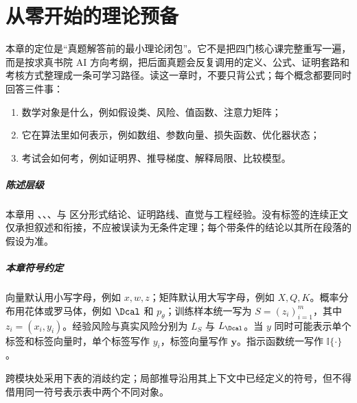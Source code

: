 \chapter{从零开始的理论预备}
\label{ch:primer}

本章的定位是“真题解答前的最小理论闭包”。它不是把四门核心课完整重写一遍，而是按求真书院 AI 方向考纲，把后面真题会反复调用的定义、公式、证明套路和考核方式整理成一条可学习路径。读这一章时，不要只背公式；每个概念都要同时回答三件事：

\begin{enumerate}
  \item 数学对象是什么，例如假设类、风险、值函数、注意力矩阵；
  \item 它在算法里如何表示，例如数组、参数向量、损失函数、优化器状态；
  \item 考试会如何考，例如证明界、推导梯度、解释局限、比较模型。
\end{enumerate}


\paragraph{陈述层级}

本章用 、\theoremlabel、\proofsketchlabel、\heuristiclabel 与 \engineeringlabel 区分形式结论、证明路线、直觉与工程经验。没有标签的连续正文仅承担叙述和衔接，不应被误读为无条件定理；每个带条件的结论以其所在段落的假设为准。

\paragraph{本章符号约定}

向量默认用小写字母，例如 \(x,w,z\)；矩阵默认用大写字母，例如 \(X,Q,K\)。概率分布用花体或罗马体，例如 \(\Dcal\) 和 \(p_\theta\)；训练样本统一写为 \(S=(z_i)_{i=1}^m\)，其中 \(z_i=(x_i,y_i)\)。经验风险与真实风险分别为 \(L_S\) 与 \(L_{\Dcal}\)。当 \(y\) 同时可能表示单个标签和标签向量时，单个标签写作 \(y_i\)，标签向量写作 \(\mathbf{y}\)。指示函数统一写作 \(\mathbb{I}\{\cdot\}\)。

跨模块处采用下表的消歧约定；局部推导沿用其上下文中已经定义的符号，但不得借用同一符号表示表中两个不同对象。

